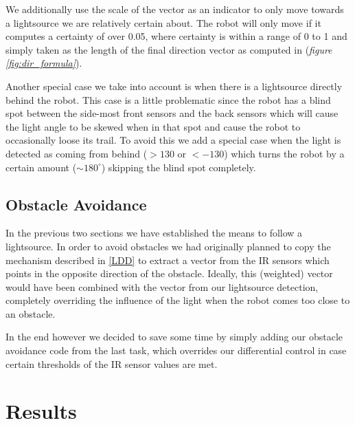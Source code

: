 \documentclass[paper=a4, fontsize=12pt]{scrartcl}	%
\numberwithin{equation}{section}		%
\numberwithin{figure}{section}			%
\numberwithin{table}{section}				%
\begin{document}

We additionally use the scale of the vector as an indicator to only move towards a lightsource we are relatively certain about. The robot will only move if it computes a certainty of over 0.05, where certainty is within a range of 0 to 1 and simply taken as the length of the final direction vector as computed in (\emph{figure \ref{fig:dir_formula}}).

Another special case we take into account is when there is a lightsource directly behind the robot. This case is a little problematic since the robot has a blind spot between the side-most front sensors and the back sensors which will cause the light angle to be skewed when in that spot and cause the robot to occasionally loose its trail. To avoid this we add a special case when the light is detected as coming from behind (\(> 130\) or \(< -130\)) which turns the robot by a certain amount (\(\sim180^{\circ}\)) skipping the blind spot completely.
\subsection{Obstacle Avoidance}
In the previous two sections we have established the means to follow a lightsource. In order to avoid obstacles we had originally planned to copy the mechanism described in \ref{LDD} to extract a vector from the IR sensors which points in the opposite direction of the obstacle. Ideally, this (weighted) vector would have been combined with the vector from our lightsource detection, completely overriding the influence of the light when the robot comes too close to an obstacle. 

In the end however we decided to save some time by simply adding our obstacle avoidance code from the last task, which overrides our differential control in case certain thresholds of the IR sensor values are met.
\section{Results}
\end{document}
